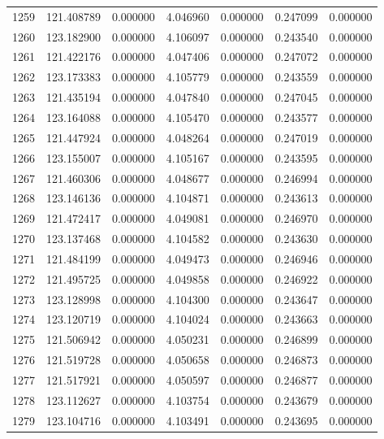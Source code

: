 \begin{tabular}{rrrrrrr}
1259 & 121.408789 &    0.000000 &  4.046960 &    0.000000 &    0.247099 &  0.000000 \\
1260 & 123.182900 &    0.000000 &  4.106097 &    0.000000 &    0.243540 &  0.000000 \\
1261 & 121.422176 &    0.000000 &  4.047406 &    0.000000 &    0.247072 &  0.000000 \\
1262 & 123.173383 &    0.000000 &  4.105779 &    0.000000 &    0.243559 &  0.000000 \\
1263 & 121.435194 &    0.000000 &  4.047840 &    0.000000 &    0.247045 &  0.000000 \\
1264 & 123.164088 &    0.000000 &  4.105470 &    0.000000 &    0.243577 &  0.000000 \\
1265 & 121.447924 &    0.000000 &  4.048264 &    0.000000 &    0.247019 &  0.000000 \\
1266 & 123.155007 &    0.000000 &  4.105167 &    0.000000 &    0.243595 &  0.000000 \\
1267 & 121.460306 &    0.000000 &  4.048677 &    0.000000 &    0.246994 &  0.000000 \\
1268 & 123.146136 &    0.000000 &  4.104871 &    0.000000 &    0.243613 &  0.000000 \\
1269 & 121.472417 &    0.000000 &  4.049081 &    0.000000 &    0.246970 &  0.000000 \\
1270 & 123.137468 &    0.000000 &  4.104582 &    0.000000 &    0.243630 &  0.000000 \\
1271 & 121.484199 &    0.000000 &  4.049473 &    0.000000 &    0.246946 &  0.000000 \\
1272 & 121.495725 &    0.000000 &  4.049858 &    0.000000 &    0.246922 &  0.000000 \\
1273 & 123.128998 &    0.000000 &  4.104300 &    0.000000 &    0.243647 &  0.000000 \\
1274 & 123.120719 &    0.000000 &  4.104024 &    0.000000 &    0.243663 &  0.000000 \\
1275 & 121.506942 &    0.000000 &  4.050231 &    0.000000 &    0.246899 &  0.000000 \\
1276 & 121.519728 &    0.000000 &  4.050658 &    0.000000 &    0.246873 &  0.000000 \\
1277 & 121.517921 &    0.000000 &  4.050597 &    0.000000 &    0.246877 &  0.000000 \\
1278 & 123.112627 &    0.000000 &  4.103754 &    0.000000 &    0.243679 &  0.000000 \\
1279 & 123.104716 &    0.000000 &  4.103491 &    0.000000 &    0.243695 &  0.000000 \\

\end{tabular}
